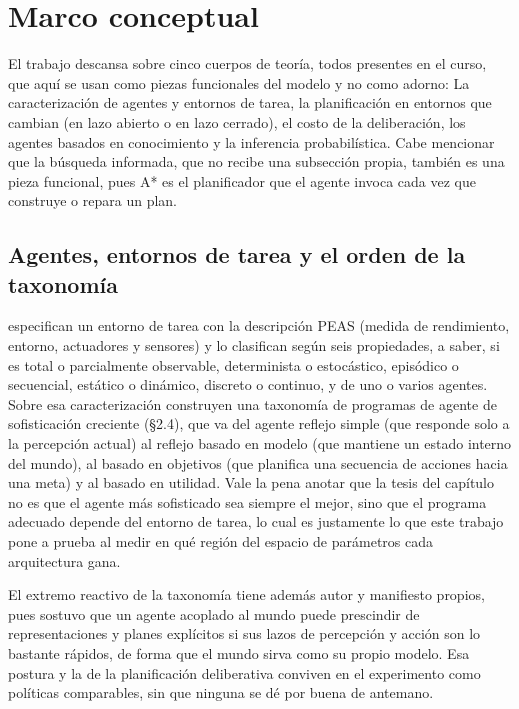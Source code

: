 \section{Marco conceptual}\label{sec:marco}


El trabajo descansa sobre cinco cuerpos de teoría, todos presentes en el curso, que aquí se usan como piezas funcionales del modelo y no como adorno: La caracterización de agentes y entornos de tarea, la planificación en entornos que cambian (en lazo abierto o en lazo cerrado), el costo de la deliberación, los agentes basados en conocimiento y la inferencia probabilística. Cabe mencionar que la búsqueda informada, que no recibe una subsección propia, también es una pieza funcional, pues A* es el planificador que el agente invoca cada vez que construye o repara un plan.

\subsection{Agentes, entornos de tarea y el orden de la taxonomía}

\textcite[§2.3]{russellNorvig2020} especifican un entorno de tarea con la descripción PEAS (medida de rendimiento, entorno, actuadores y sensores) y lo clasifican según seis propiedades, a saber, si es total o parcialmente observable, determinista o estocástico, episódico o secuencial, estático o dinámico, discreto o continuo, y de uno o varios agentes. Sobre esa caracterización construyen una taxonomía de programas de agente de sofisticación creciente (§2.4), que va del agente reflejo simple (que responde solo a la percepción actual) al reflejo basado en modelo (que mantiene un estado interno del mundo), al basado en objetivos (que planifica una secuencia de acciones hacia una meta) y al basado en utilidad. Vale la pena anotar que la tesis del capítulo no es que el agente más sofisticado sea siempre el mejor, sino que el programa adecuado depende del entorno de tarea, lo cual es justamente lo que este trabajo pone a prueba al medir en qué región del espacio de parámetros cada arquitectura gana.

El extremo reactivo de la taxonomía tiene además autor y manifiesto propios, pues \textcite{brooks1991intelligence} sostuvo que un agente acoplado al mundo puede prescindir de representaciones y planes explícitos si sus lazos de percepción y acción son lo bastante rápidos, de forma que el mundo sirva como su propio modelo. Esa postura y la de la planificación deliberativa conviven en el experimento como políticas comparables, sin que ninguna se dé por buena de antemano.

